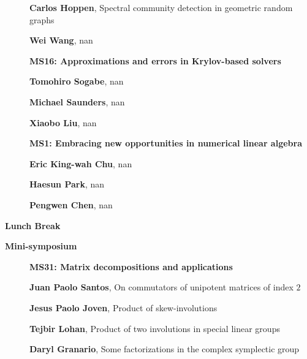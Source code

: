 \documentclass[ILAS2025-program.tex]{subfiles}
\begin{document}
\begin{description}
\begin{description}
        \item[] \textbf{Carlos Hoppen}, Spectral community detection in geometric random graphs
        \item[] \textbf{Wei Wang}, nan
        \end{description}
    \begin{description}
    \item[] {\color{mstitle}\textbf{MS16: Approximations and errors in Krylov-based solvers}} 
    \item[] \textbf{Tomohiro Sogabe}, nan
        \item[] \textbf{Michael Saunders}, nan
        \item[] \textbf{Xiaobo Liu}, nan
        \end{description}
    \begin{description}
    \item[] {\color{mstitle}\textbf{MS1: Embracing new opportunities in numerical linear algebra}} 
    \item[] \textbf{Eric King-wah Chu}, nan
        \item[] \textbf{Haesun Park}, nan
        \item[] \textbf{Pengwen Chen}, nan
        \end{description}
    \item[\info{12:00\textrm{--}13:30}] \textbf{Lunch Break} \info{}
    \item[\info{13:30\textrm{--}15:30}] \textbf{Mini-symposium} 
    \begin{description}
    \item[] {\color{mstitle}\textbf{MS31: Matrix decompositions and applications}} 
    \item[] \textbf{Juan Paolo Santos}, On commutators of unipotent matrices of index $2$
        \item[] \textbf{Jesus Paolo Joven}, Product of skew-involutions
        \item[] \textbf{Tejbir Lohan}, Product of two involutions in special linear groups
        \item[] \textbf{Daryl Granario}, Some factorizations in the complex symplectic group

\end{description}
\end{description}
\end{document}
